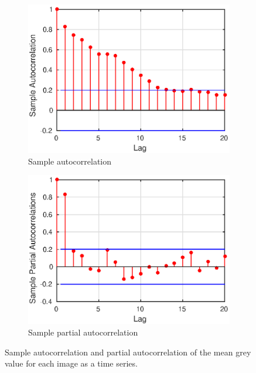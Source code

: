 \documentclass[12pt]{report}
\begin{document}
\begin{figure}[p]
	\centering
	\begin{subfigure}[b]{0.45\textwidth}
		\includegraphics[width=1\textwidth]{figures/initial_acf.eps}
		\caption{Sample autocorrelation}
	\end{subfigure}
	\begin{subfigure}[b]{0.45\textwidth}
		\includegraphics[width=1\textwidth]{figures/initial_pacf.eps}
		\caption{Sample partial autocorrelation}
	\end{subfigure}
	\caption{Sample autocorrelation and partial autocorrelation of the mean grey value for each image as a time series.}
	\label{fig:timeSeries_acf_pacf}
\end{figure}
\end{document}
